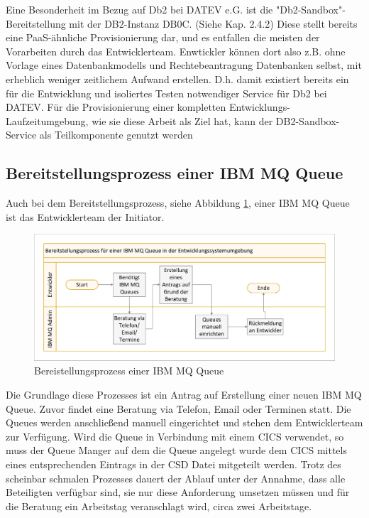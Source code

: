 Eine Besonderheit im Bezug auf Db2 bei DATEV e.G. ist die "Db2-Sandbox"-Bereitstellung mit der DB2-Instanz DB0C. (Siehe Kap. 2.4.2)
Diese stellt bereits eine PaaS-ähnliche Provisionierung dar, und es entfallen die meisten der Vorarbeiten durch das Entwicklerteam. 
Enwtickler können dort also z.B. ohne Vorlage eines Datenbankmodells und Rechtebeantragung Datenbanken selbst, mit erheblich weniger zeitlichem Aufwand erstellen.  
D.h. damit existiert bereits ein für die Entwicklung und isoliertes Testen notwendiger Service für Db2 bei DATEV.
Für die Provisionierung einer kompletten Entwicklungs-Laufzeitumgebung, wie sie diese Arbeit als Ziel hat, kann der DB2-Sandbox-Service als Teilkomponente genutzt werden

\subsection{Bereitstellungsprozess einer IBM MQ Queue}
Auch bei dem Bereitstellungsprozess, siehe Abbildung \ref{fig:aktmq}, einer IBM MQ Queue ist das Entwicklerteam der Initiator.

\begin{figure}[ht!]
\centering
\includegraphics[width=\paperwidth,angle=90]{figures/swimlaneMQ.pdf}
\caption{Bereistellungsprozess einer IBM MQ Queue}
\label{fig:aktmq}
\end{figure}

Die Grundlage diese Prozesses ist ein Antrag auf Erstellung einer neuen IBM MQ Queue.
Zuvor findet eine Beratung via Telefon, Email oder Terminen statt.
Die Queues werden anschließend manuell eingerichtet und stehen dem Entwicklerteam zur Verfügung.
Wird die Queue in Verbindung mit einem CICS verwendet, so muss der Queue Manger auf dem die Queue angelegt wurde dem CICS mittels eines entsprechenden Eintrags in der CSD Datei mitgeteilt werden.
Trotz des scheinbar schmalen Prozesses dauert der Ablauf unter der Annahme, dass alle Beteiligten verfügbar sind, sie nur diese Anforderung umsetzen müssen und für die Beratung ein Arbeitstag veranschlagt wird, circa zwei Arbeitstage.

